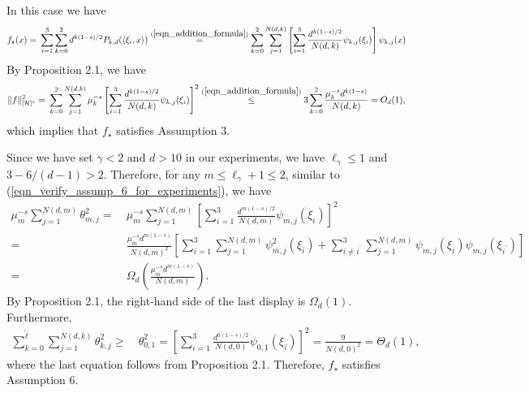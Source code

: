 \documentclass{article}
\theoremstyle{plain}
\theoremstyle{definition}
\theoremstyle{remark}
\newcommand{\calH}{\mathcal{H}}
\begin{document}
\begin{appendix}
 In this case we have
\begin{equation*}
    \begin{aligned}
        f_{\star}(x) = &~ \sum_{i=1}^{3} \sum_{k=0}^{2} d^{k(1-s)/2} P_{k, d}(\langle\xi_{i}, x\rangle)
        \overset{(\ref{eqn_addition_formula})}{=}
        \sum_{k=0}^{2} \sum_{j=1}^{N(d, k)} \left[\sum_{i=1}^{3} \frac{d^{k(1-s)/2}}{N(d, k)} \psi_{k,j}(\xi_{i}) \right]  \psi_{k,j}(x) 
    \end{aligned}
\end{equation*}
By Proposition 2.1, we have
$$
\begin{aligned}
 \|f\|_{[\calH]^{s}}^2 =&~ \sum_{k=0}^{2} \sum_{j=1}^{N(d, k)} \mu_k^{-s} \left[\sum_{i=1}^{3} \frac{d^{k(1-s)/2}}{N(d, k)} \psi_{k,j}(\xi_{i}) \right]^2 \overset{(\ref{eqn_addition_formula})}{\leq}
        3 \sum_{k=0}^{2} \frac{\mu_k^{-s}d^{k(1-s)}}{N(d, k)} = O_d(1),
\end{aligned}
$$
which implies that $f_{\star}$ satisfies Assumption 3. 



Since we have set $\gamma<2$ and $d>10$ in our experiments, we have $\ell_{\gamma} \leq 1$ and $3-6/(d-1)>2$. 
Therefore, for any $m \leq \ell_{\gamma}+1 \leq 2$, similar to (\ref{eqn_verify_assump_6_for_experiments}), we have
\begin{equation*}
    \begin{aligned}
        \mu_{m}^{-s} \sum\limits_{j=1}^{N(d, m)}  \theta_{m,j}^{2} =&~ \mu_{m}^{-s} \sum\limits_{j=1}^{N(d, m)}  \left[\sum_{i=1}^{3} \frac{d^{m(1-s)/2}}{N(d, m)} \psi_{m,j}(\xi_{i}) \right]^2\\
        =&~  \frac{\mu_{m}^{-s} d^{m(1-s)}}{N(d, m)^2} \left[\sum_{i=1}^{3} \sum\limits_{j=1}^{N(d, m)} \psi_{m,j}^2(\xi_{i}) + \sum_{i \neq i^{\prime}}^{3} \sum\limits_{j=1}^{N(d, m)} \psi_{m,j}(\xi_{i}) \psi_{m,j}(\xi_{i^{\prime}}) \right]\\
        =&~ \Omega_d\left(
        \frac{\mu_{m}^{-s} d^{m(1-s)}}{N(d, m)}
        \right). 
    \end{aligned}
\end{equation*}
 By Proposition 2.1, the right-hand side of the last display is $\Omega_d(1)$. Furthermore, 
$$
\begin{aligned}
\sum\limits_{k=0}^{\tilde{\ell}} \sum\limits_{j =1}^{N(d, k)}  \theta_{k, j}^{2} \geq &~ \theta_{0, 1}^{2} = \left[\sum_{i=1}^{3} \frac{d^{0(1-s)/2}}{N(d, 0)} \psi_{0,1}(\xi_{i}) \right]^2 = \frac{9}{N(d, 0)^2} = \Theta_d(1),
\end{aligned}
$$
where the last equation follows from Proposition 2.1. 
Therefore, $f_{\star}$ satisfies Assumption 6.



\end{appendix}
\end{document}
